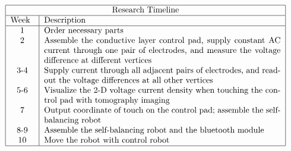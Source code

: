 \documentclass[a4paper,12pt]{article}
\newcommand{\ce}{\centering}
\begin{document}
$$
\begin{tabular}{ |p{1cm}|p{10cm}|  }
	\hline
		\multicolumn{2}{|c|}{Research Timeline} \\
	\hline
		 Week & Description \\
	\hline
		\ce 1		& 	Order necessary parts\\
		\ce 2		&	Assemble the conductive layer control pad, supply constant AC current through one pair of electrodes, and measure the voltage difference at different vertices\\
		\ce 3-4		&	Supply current through all adjacent pairs of electrodes, and readout the voltage differences at all other vertices\\
		\ce 5-6		&	Visualize the 2-D voltage current density	when touching the control pad with tomography imaging\\
		\ce 7		&	Output coordinate of touch on the control pad; assemble the self-balancing robot\\
		\ce 8-9		&	Assemble the self-balancing robot and the bluetooth module\\
		\ce 10		&	Move the robot with control robot\\
	\hline
\end{tabular}
$$
\end{document}
